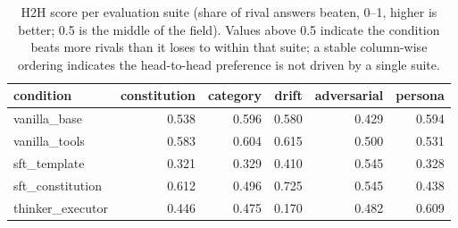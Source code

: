 \begin{table}[t]
  \centering
  \caption{H2H score per evaluation suite (share of rival answers beaten, 0--1, higher is better; 0.5 is the middle of the field). Values above 0.5 indicate the condition beats more rivals than it loses to within that suite; a stable column-wise ordering indicates the head-to-head preference is not driven by a single suite.}
  \label{tab:rank-by-suite}
  \begin{tabular}{lrrrrr}
    \toprule
    condition & constitution & category & drift & adversarial & persona \\
    \midrule
    vanilla\_base & 0.538 & 0.596 & 0.580 & 0.429 & 0.594 \\
    vanilla\_tools & 0.583 & 0.604 & 0.615 & 0.500 & 0.531 \\
    sft\_template & 0.321 & 0.329 & 0.410 & 0.545 & 0.328 \\
    sft\_constitution & 0.612 & 0.496 & 0.725 & 0.545 & 0.438 \\
    thinker\_executor & 0.446 & 0.475 & 0.170 & 0.482 & 0.609 \\
    \bottomrule
  \end{tabular}
\end{table}
